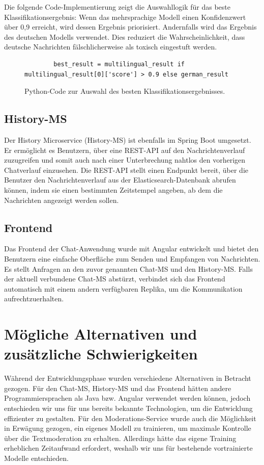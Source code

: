 \documentclass[12pt]{report}
\begin{document}
Die folgende Code-Implementierung zeigt die Auswahllogik für das beste Klassifikationsergebnis: Wenn das mehrsprachige Modell einen Konfidenzwert über 0,9 erreicht, wird dessen Ergebnis priorisiert. Andernfalls wird das Ergebnis des deutschen Modells verwendet. Dies reduziert die Wahrscheinlichkeit, dass deutsche Nachrichten fälschlicherweise als toxisch eingestuft werden.
\begin{figure}[h]
	\centering
	\begin{lstlisting}
		best_result = multilingual_result if multilingual_result[0]['score'] > 0.9 else german_result
	\end{lstlisting}
	\caption{Python-Code zur Auswahl des besten Klassifikationsergebnisses.}
	\label{fig:best_result_selection}
\end{figure}

\subsection{History-MS}
Der History Microservice (History-MS) ist ebenfalls im Spring Boot umgesetzt. Er ermöglicht es Benutzern, über eine REST-API auf den Nachrichtenverlauf zuzugreifen und somit auch nach einer Unterbrechung nahtlos den vorherigen Chatverlauf einzusehen. Die REST-API stellt einen Endpunkt bereit, über die Benutzer den Nachrichtenverlauf aus der Elasticsearch-Datenbank abrufen können, indem sie einen bestimmten Zeitstempel angeben, ab dem die Nachrichten angezeigt werden sollen.


\subsection{Frontend}
Das Frontend der Chat-Anwendung wurde mit Angular entwickelt und bietet den Benutzern eine einfache Oberfläche zum Senden und Empfangen von Nachrichten. Es stellt Anfragen an den zuvor genannten Chat-MS und den History-MS. Falls der aktuell verbundene Chat-MS abstürzt, verbindet sich das Frontend automatisch mit einem andern verfügbaren Replika, um die Kommunikation aufrechtzuerhalten.
\section{Mögliche Alternativen und zusätzliche Schwierigkeiten}

Während der Entwicklungsphase wurden verschiedene Alternativen in Betracht gezogen. Für den Chat-MS, History-MS und das Frontend hätten andere Programmiersprachen als Java bzw. Angular verwendet werden können, jedoch entschieden wir uns für uns bereits bekannte Technologien, um die Entwicklung effizienter zu gestalten. Für den Moderations-Service wurde auch die Möglichkeit in Erwägung gezogen, ein eigenes Modell zu trainieren, um maximale Kontrolle über die Textmoderation zu erhalten. Allerdings hätte das eigene Training erheblichen Zeitaufwand erfordert, weshalb wir uns für bestehende vortrainierte Modelle entschieden.\newline
\end{document}
